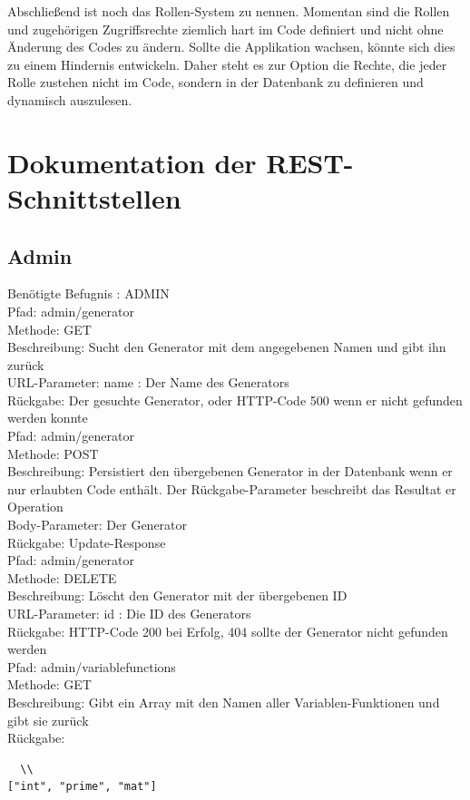 Abschließend ist noch das Rollen-System zu nennen. Momentan sind die Rollen und zugehörigen Zugriffsrechte ziemlich hart im Code definiert und nicht ohne Änderung des Codes zu ändern. Sollte die Applikation wachsen, könnte sich dies zu einem Hindernis entwickeln. Daher steht es zur Option die Rechte, die jeder Rolle zustehen nicht im Code, sondern in der Datenbank zu definieren und dynamisch auszulesen.

\appendix
\chapter{Dokumentation der REST-Schnittstellen}

\section{Admin}


Benötigte Befugnis : ADMIN \\

\noindent Pfad: admin/generator \\
Methode: GET \\
Beschreibung: Sucht den Generator mit dem angegebenen Namen und gibt ihn zurück \\
URL-Parameter: name : Der Name des Generators \\
Rückgabe: Der gesuchte Generator, oder HTTP-Code 500 wenn er nicht gefunden werden konnte \\

\noindent Pfad: admin/generator \\
Methode: POST \\
Beschreibung: Persistiert den übergebenen Generator in der Datenbank wenn er nur erlaubten Code enthält. Der Rückgabe-Parameter beschreibt das Resultat er Operation \\
Body-Parameter: Der Generator \\
Rückgabe: Update-Response \\

\noindent Pfad: admin/generator \\
Methode: DELETE \\
Beschreibung: Löscht den Generator mit der übergebenen ID \\
URL-Parameter: id : Die ID des Generators\\
Rückgabe: HTTP-Code 200 bei Erfolg, 404 sollte der Generator nicht gefunden werden \\

\noindent Pfad: admin/variablefunctions \\
Methode: GET \\
Beschreibung: Gibt ein Array mit den Namen aller Variablen-Funktionen und gibt sie zurück \\
Rückgabe: \begin{lstlisting}  \\
["int", "prime", "mat"]
\end{lstlisting}


